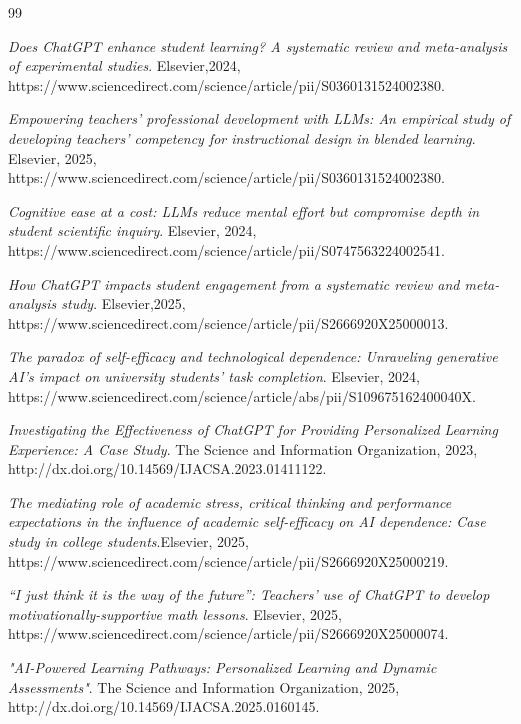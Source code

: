 \documentclass[a4paper,9pt]{article}
\begin{document}
\begin{thebibliography}{99}
	
	
	\textit{Does ChatGPT enhance student learning? A systematic review and meta-analysis of experimental studies}. Elsevier,2024, https://www.sciencedirect.com/science/article/pii/S0360131524002380.
	
    \textit{Empowering teachers' professional development with LLMs: An empirical study of developing teachers' competency for instructional design in blended learning}. Elsevier, 2025, https://www.sciencedirect.com/science/article/pii/S0360131524002380.
	
	\textit{Cognitive ease at a cost: LLMs reduce mental effort but compromise depth in student scientific inquiry}. Elsevier, 2024, https://www.sciencedirect.com/science/article/pii/S0747563224002541.
	
	\textit{How ChatGPT impacts student engagement from a systematic review and meta-analysis study}. Elsevier,2025, https://www.sciencedirect.com/science/article/pii/S2666920X25000013.
	
	\textit{The paradox of self-efficacy and technological dependence: Unraveling generative AI's impact on university students' task completion}. Elsevier, 2024, https://www.sciencedirect.com/science/article/abs/pii/S109675162400040X.
	
	\textit{Investigating the Effectiveness of ChatGPT for Providing Personalized Learning Experience: A Case Study}. The Science and Information Organization, 2023, http://dx.doi.org/10.14569/IJACSA.2023.01411122.
	
	\textit{The mediating role of academic stress, critical thinking and performance expectations in the influence of academic self-efficacy on AI dependence: Case study in college students}.Elsevier, 2025, https://www.sciencedirect.com/science/article/pii/S2666920X25000219.
	
	\textit{“I just think it is the way of the future”: Teachers' use of ChatGPT to develop motivationally-supportive math lessons}. Elsevier, 2025, https://www.sciencedirect.com/science/article/pii/S2666920X25000074.
	
	\textit{"AI-Powered Learning Pathways: Personalized Learning and Dynamic Assessments"}. The Science and Information Organization, 2025, http://dx.doi.org/10.14569/IJACSA.2025.0160145.
	

\end{thebibliography}
\end{document}
